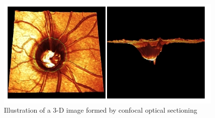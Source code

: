 \begin{figure}[htbp]
\centering
\includegraphics{figures/3dcslo}
\caption{Illustration of a 3-D image formed by confocal optical sectioning}
\label{fig:3d}
   \end{figure}

